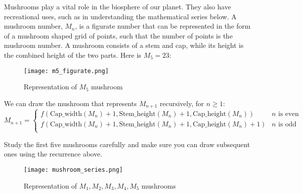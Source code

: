 \documentclass[addpoints]{exam}
\begin{document}
\begin{questions}
\begin{solution}
    
  \end{solution}
  
\question Mushrooms play a vital role in the biosphere of our planet. They also have recreational uses, such as in understanding the mathematical series below. A mushroom number, $M_n$, is a figurate number that can be represented in the form of a mushroom shaped grid of points, such that the number of points is the mushroom number. A mushroom consists of a stem and cap, while its height is the combined height of the two parts. Here is $M_5=23$:

\begin{figure}[h]
  \centering
  \texttt{[image: m5\_figurate.png]}
  \caption{Representation of $M_5$ mushroom}
  \label{fig:mushroom_anatomy}
\end{figure}

We can draw the mushroom that represents $M_{n+1}$ recursively, for $n \geq 1$:
\[ 
    M_{n+1}=
    \begin{cases} 
      f(\textrm{Cap\_width}(M_n) + 1, \textrm{Stem\_height}(M_n) + 1, \textrm{Cap\_height}(M_n))  & n \textrm{ is even} \\
      f(\textrm{Cap\_width}(M_n) + 1, \textrm{Stem\_height}(M_n) + 1, \textrm{Cap\_height}(M_n)+1) & n \textrm{ is odd}  \\      
   \end{cases}
\]

Study the first five mushrooms carefully and make sure you can draw subsequent ones using the recurrence above.

\begin{figure}[h]
  \centering
  \texttt{[image: mushroom\_series.png]}
  \caption{Representation of $M_1,M_2,M_3,M_4,M_5$ mushrooms}
  \label{fig:mushroom_anatomy}
\end{figure}

\end{questions}
\end{document}
